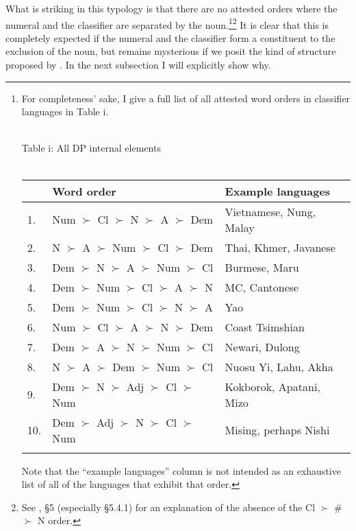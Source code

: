\documentclass[output=paper
,modfonts
,nonflat]{langsci/langscibook}
\begin{document}
What is striking in this typology is that there are no attested orders where the numeral and the classifier are separated by the noun.\footnote{For completeness' sake, I give a full list of all attested word orders in classifier languages in Table i. \vspace{-0.3cm}	

{\centering 
~\\
	Table i: All DP internal elements\\
~\\
\hspace{0.10\textwidth} \begin{tabularx}{0.75\textwidth}{lXX}
	\lsptoprule
	&Word order&Example languages\\
	\midrule
	1.&Num $\succ$ Cl $\succ$ N $\succ$ A $\succ$ Dem& {Vietnamese}, {Nung}, {Malay}\\
	2.&N $\succ$ A $\succ$ Num $\succ$ Cl $\succ$ Dem& {Thai}, {Khmer}, {Javanese}\\
	3.&Dem $\succ$ N $\succ$ A $\succ$ Num $\succ$ Cl& {Burmese}, {Maru}\\
	4.&Dem $\succ$ Num $\succ$ Cl $\succ$ A $\succ$ N& MC, {Cantonese}\\
	5.&Dem $\succ$ Num $\succ$ Cl $\succ$ N $\succ$ A& {Yao}\\
	6.&Num $\succ$ Cl $\succ$ A $\succ$ N $\succ$ Dem& {Coast Tsimshian}\\
	7.&Dem $\succ$ A $\succ$ N $\succ$ Num $\succ$ Cl&{Newari}, {Dulong}\\
	8.&N $\succ$ A $\succ$ Dem $\succ$ Num $\succ$ Cl& {Nuosu Yi}, {Lahu}, Akha\\
	9.&Dem $\succ$ N $\succ$ Adj $\succ$ Cl $\succ$ Num & {Kokborok}, Apatani, {Mizo}\\
	10.&Dem $\succ$ Adj $\succ$ N $\succ$ Cl $\succ$ Num & {Mising}, perhaps {Nishi}\\ 
	\lspbottomrule
\end{tabularx}} \vspace{0.2cm}

Note that the ``example languages'' column is not intended as an exhaustive list of all of the languages that exhibit that order.}\tss{,}\footnote{See \citet{Hall2015}, \S5 (especially \S5.4.1) for an explanation of the absence of the Cl $\succ$ \# $\succ$ N order.} It is clear that this is completely expected if the numeral and the classifier form a constituent to the exclusion of the noun, but remains mysterious if we posit the kind of structure proposed by \citet{Simpson2005}. In the next subsection I will explicitly show why.
\end{document}
